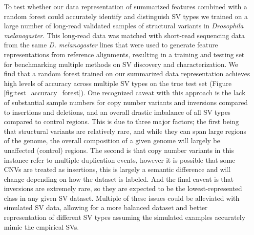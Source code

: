 To test whether our data representation of summarized features combined with a random forest could accurately identify and distinguish SV types we trained on a large number of long-read validated samples of structural variants in \textit{Drosophila melanogaster}. This long-read data was matched with short-read sequencing data from the same \textit{D. melanogaster} lines that were used to generate feature representations from reference alignments, resulting in a training and testing set for benchmarking multiple methods on SV discovery and characterization. We find that a random forest trained on our summarized data representation achieves high levels of accuracy across multiple SV types on the true test set (Figure \ref{fig:test_accuracy_forest}). One recognized caveat with this approach is the lack of substantial sample numbers for copy number variants and inversions compared to insertions and deletions, and an overall drastic imbalance of all SV types compared to control regions. This is due to three major factors; the first being that structural variants are relatively rare, and while they can span large regions of the genome, the overall composition of a given genome will largely be unaffected (control) regions. The second is that copy number variants in this instance refer to multiple duplication events, however it is possible that some CNVs are treated as insertions, this is largely a semantic difference and will change depending on how the dataset is labeled. And the final caveat is that inversions are extremely rare, so they are expected to be the lowest-represented class in any given SV dataset. Multiple of these issues could be alleviated with simulated SV data, allowing for a more balanced dataset and better representation of different SV types assuming the simulated examples accurately mimic the empirical SVs. 

